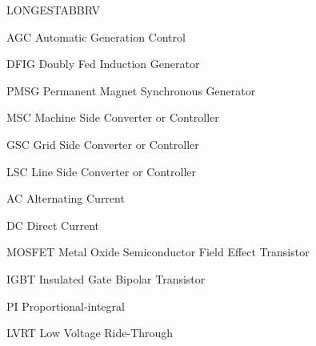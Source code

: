 \begin{theglossary}{LONGESTABBRV}
\item[AGC] Automatic Generation Control
\item[DFIG] Doubly Fed Induction Generator
\item[PMSG] Permanent Magnet Synchronous Generator
\item[MSC] Machine Side Converter or Controller
\item[GSC] Grid Side Converter or Controller
\item[LSC] Line Side Converter or Controller
\item[AC] Alternating Current
\item[DC] Direct Current
\item[MOSFET] Metal Oxide Semiconductor Field Effect Transistor
\item[IGBT] Insulated Gate Bipolar Transistor
\item[PI] Proportional-integral
\item[LVRT] Low Voltage Ride-Through

\end{theglossary}
